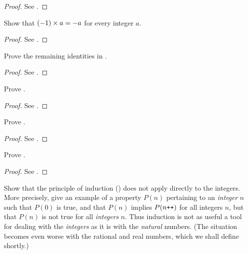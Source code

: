 \begin{proof}
See .
\end{proof}

\begin{exercise} \label{exercise 4.1.3}
Show that \((-1) \times a = -a\) for every integer \(a\).
\end{exercise}

\begin{proof}
See .
\end{proof}

\begin{exercise} \label{exercise 4.1.4}
Prove the remaining identities in .
\end{exercise}

\begin{proof}
See .
\end{proof}

\begin{exercise} \label{exercise 4.1.5}
Prove .
\end{exercise}

\begin{proof}
See .
\end{proof}

\begin{exercise} \label{exercise 4.1.6}
Prove .
\end{exercise}

\begin{proof}
See .
\end{proof}

\begin{exercise} \label{exercise 4.1.7}
Prove .
\end{exercise}

\begin{proof}
See .
\end{proof}

\begin{exercise} \label{exercise 4.1.8}
Show that the principle of induction () does not apply directly to the integers.
More precisely, give an example of a property \(P(n)\) pertaining to an \emph{integer} \(n\) such that \(P(0)\) is true, and that \(P(n)\) implies \(P(n\texttt{++})\) for all integers \(n\), but that \(P(n)\) is not true for all \emph{integers} \(n\).
Thus induction is not as useful a tool for dealing with the \emph{integers} as it is with the \emph{natural} numbers.
(The situation becomes even worse with the rational and real numbers, which we shall define shortly.)
\end{exercise}

